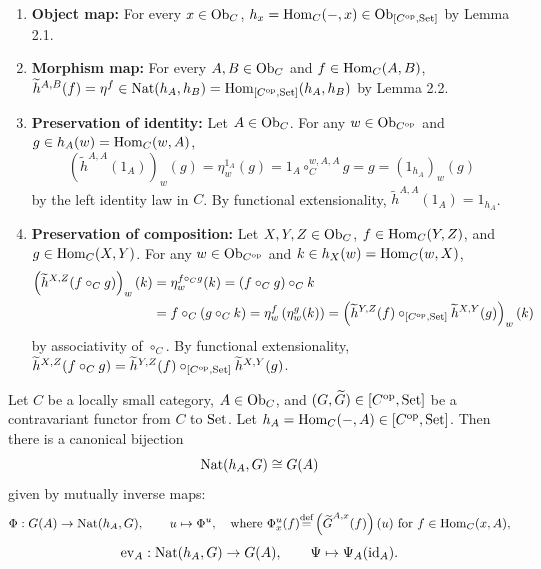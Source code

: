 \documentclass[10pt,a4paper]{article}
\begin{document}
\begin{enumerate}
\item \textbf{Object map:} For every $x \in {\textrm{Ob}}_C$, $h_x = {\textrm{Hom}}_C(-,x) \in {\textrm{Ob}}_{[C^{\textrm{op}},{\textrm{Set}}]}$ by Lemma 2.1.
\item \textbf{Morphism map:} For every $A,B \in {\textrm{Ob}}_C$ and $f \in {\textrm{Hom}}_C(A,B)$, $\widetilde{h}^{A,B}(f) = \eta^f \in {\textrm{Nat}}(h_A, h_B) = {\textrm{Hom}}_{[C^{\textrm{op}},{\textrm{Set}}]}(h_A, h_B)$ by Lemma 2.2.
\item \textbf{Preservation of identity:} Let $A \in {\textrm{Ob}}_C$. For any $w \in {\textrm{Ob}}_{C^{\textrm{op}}}$ and $g \in h_A(w) = {\textrm{Hom}}_C(w,A)$,
$$\left(\widetilde{h}^{A,A}(1_A)\right)_w(g) = \eta^{1_A}_w(g) = 1_A \circ_C^{w,A,A} g = g = \left(1_{h_A}\right)_w(g)$$
by the left identity law in $C$. By functional extensionality, $\widetilde{h}^{A,A}(1_A) = 1_{h_A}$.
\item \textbf{Preservation of composition:} Let $X,Y,Z \in {\textrm{Ob}}_C$, $f \in {\textrm{Hom}}_C(Y,Z)$, and $g \in {\textrm{Hom}}_C(X,Y)$. For any $w \in {\textrm{Ob}}_{C^{\textrm{op}}}$ and $k \in h_X(w) = {\textrm{Hom}}_C(w,X)$,
\begin{align*}
\left(\widetilde{h}^{X,Z}(f \circ_C g)\right)_w(k) &= \eta^{f \circ_C g}_w(k) = (f \circ_C g) \circ_C k \\
&= f \circ_C (g \circ_C k) = \eta^f_w\left(\eta^g_w(k)\right) = \left(\widetilde{h}^{Y,Z}(f) \circ_{[C^{\textrm{op}},{\textrm{Set}}]} \widetilde{h}^{X,Y}(g)\right)_w(k)
\end{align*}
by associativity of $\circ_C$. By functional extensionality, $\widetilde{h}^{X,Z}(f \circ_C g) = \widetilde{h}^{Y,Z}(f) \circ_{[C^{\textrm{op}},{\textrm{Set}}]} \widetilde{h}^{X,Y}(g)$.
\end{enumerate}
\myqed
\begin{theorem}
Let $C$ be a locally small category, $A \in {\textrm{Ob}}_C$, and $(G, {\widetilde{G}\textrm{}}) \in [C^{\textrm{op}}, {\textrm{Set}}]$ be a contravariant functor from $C$ to ${\textrm{Set}}$. Let $h_A = {\textrm{Hom}}_C(-,A) \in [C^{\textrm{op}}, {\textrm{Set}}]$. Then there is a canonical bijection
$${\textrm{Nat}}(h_A, G) \cong G(A)$$
given by mutually inverse maps:
$$\Phi : G(A) \to {\textrm{Nat}}(h_A, G), \qquad u \mapsto \Phi^u, \quad \textrm{where } \Phi^u_x(f) {\stackrel{{\textrm{def}}}{=}} \left({\widetilde{G}\textrm{}}^{A,x}(f)\right)(u) \textrm{ for } f \in {\textrm{Hom}}_C(x,A),$$
$$\mathrm{ev}_A : {\textrm{Nat}}(h_A, G) \to G(A), \qquad \Psi \mapsto \Psi_A({\textrm{id}}_A).$$
\end{theorem}
\myprf
\end{document}
